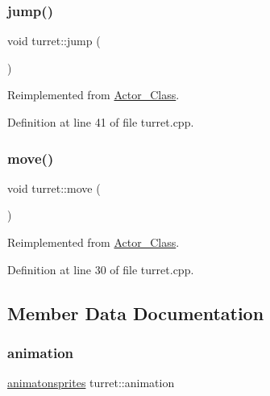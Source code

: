 \subsubsection{\texorpdfstring{jump()}{jump()}}
{\footnotesize\ttfamily void turret\+::jump (\begin{DoxyParamCaption}{ }\end{DoxyParamCaption})\hspace{0.3cm}{\ttfamily [virtual]}}



Reimplemented from \hyperlink{class_actor___class_ab33216a3ce0c856bdc16231c71ae35c2}{Actor\+\_\+\+Class}.



Definition at line 41 of file turret.\+cpp.

\hypertarget{classturret_a814fbc1d3c0ea9e10b9ec1edb3e5f734}{}\label{classturret_a814fbc1d3c0ea9e10b9ec1edb3e5f734} 
\subsubsection{\texorpdfstring{move()}{move()}}
{\footnotesize\ttfamily void turret\+::move (\begin{DoxyParamCaption}{ }\end{DoxyParamCaption})\hspace{0.3cm}{\ttfamily [virtual]}}



Reimplemented from \hyperlink{class_actor___class_af1764a94c5410ba8476f56553cd2c327}{Actor\+\_\+\+Class}.



Definition at line 30 of file turret.\+cpp.



\subsection{Member Data Documentation}
\hypertarget{classturret_ab7b13d0d01ee962c127ef5ca2e5b600a}{}\label{classturret_ab7b13d0d01ee962c127ef5ca2e5b600a} 
\subsubsection{\texorpdfstring{animation}{animation}}
{\footnotesize\ttfamily \hyperlink{classanimatonsprites}{animatonsprites} turret\+::animation}



